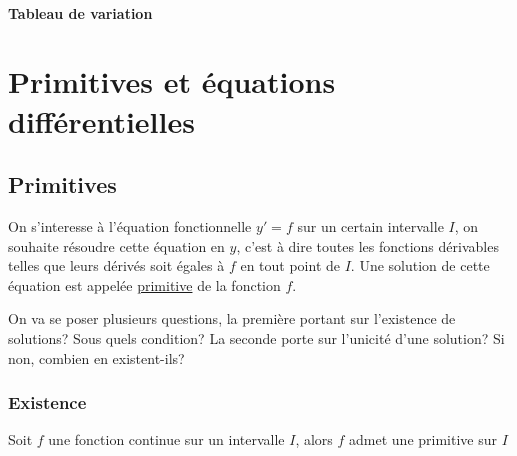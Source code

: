 \documentclass[french]{book}
\begin{document}
\subsubsection{Tableau de variation}
\begin{center}

\vspace{5mm} 
 

\end{center}


\chapter{Primitives et équations différentielles}
\section{Primitives}

\begin{defn}
On s'interesse à l'équation fonctionnelle $y'=f$ sur un certain intervalle $I$, on souhaite résoudre cette équation en $y$, c'est à dire toutes les fonctions dérivables telles que leurs dérivés soit égales à $f$ en tout point de $I$. Une solution de cette équation est appelée \underline{primitive} de la fonction $f$.
\end{defn}

On va se poser plusieurs questions, la première portant sur l'existence de solutions? Sous quels condition? La seconde porte sur l'unicité d'une solution? Si non, combien en existent-ils?

\subsection{Existence}
\begin{thm}[admis]
Soit $f$ une fonction continue sur un intervalle $I$, alors $f$ admet une primitive sur $I$
\end{thm}
\end{document}
